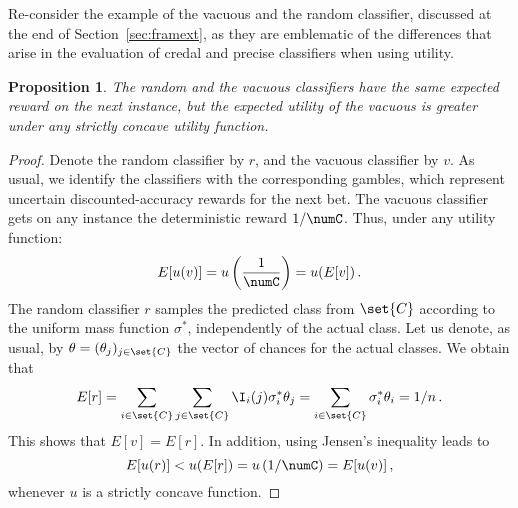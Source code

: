 \documentclass[a4paper,10pt,reqno]{amsart}
\newtheorem{proposition}{Proposition}
\theoremstyle{remark}
\begin{document}
Re-consider the example of the vacuous and the random classifier, discussed at the end of Section~\ref{sec:framext}, as they are emblematic of the differences that arise in the evaluation of credal and precise classifiers when using utility. %
\begin{proposition}\label{pr:r-v} The random and the vacuous classifiers have the same expected reward on the next instance, but the expected utility of the vacuous is greater under any strictly concave utility function.
\end {proposition}
\begin{proof}
  Denote the random classifier by $r$, and the vacuous classifier by $v$. As usual, we identify the classifiers with the corresponding gambles, which represent uncertain discounted-accuracy rewards for the next bet.
  The vacuous classifier gets on any
  instance the deterministic reward $1/\numC$. Thus, under
  any utility function:
\begin{equation*}
E[u(v)]=u\left(\frac{1}{\numC}\right)=u(E[v]) \, .
\end{equation*}
The random classifier $r$ samples the predicted class from $\set{C}$ according to the uniform mass function $\sigma^*$, independently of the actual class. Let us denote, as usual, by $\theta=(\theta_j)_{j\in\set{C}}$ the vector of chances for the actual classes. We obtain that 
\begin{equation*}
  E[r]=\sum_{i\in\set{C}}\sum_{j\in\set{C}}\I_i(j)\sigma_i^*\theta_j=\sum_{i\in\set{C}}\sigma_i^*\theta_i=1/n \, .
\end{equation*}
This shows that $E[v]=E[r]$. In addition, using Jensen's inequality leads to
\begin{equation*}
E[u(r)]<u(E[r])=u\left(1/\numC\right)=E[u(v)] \, ,\label{eq:util-random}
\end{equation*}
whenever $u$ is a strictly concave function.
\end{proof}
\end{document}
